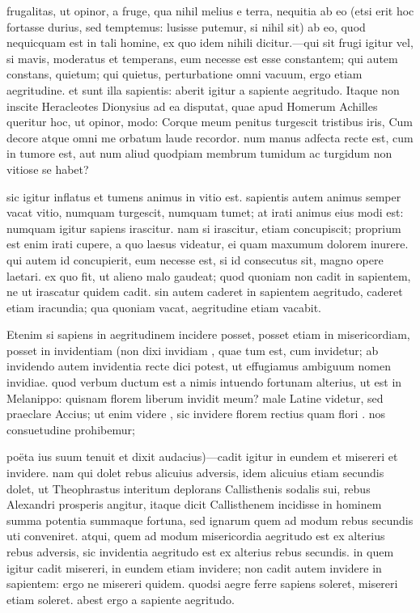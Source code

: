  frugalitas, ut opinor, a fruge, qua nihil melius e terra, nequitia ab eo (etsi erit hoc fortasse durius, sed temptemus: lusisse putemur, si nihil sit) ab eo, quod nequicquam est in tali homine, ex quo idem nihili dicitur.—qui sit frugi igitur vel, si mavis, moderatus et temperans, eum necesse est esse constantem; qui autem constans, quietum; qui quietus, perturbatione omni vacuum, ergo etiam aegritudine. et sunt illa sapientis: aberit igitur a sapiente aegritudo. Itaque non inscite Heracleotes Dionysius ad ea disputat, quae apud Homerum Achilles queritur hoc, ut opinor, modo: Corque meum penitus turgescit tristibus iris, Cum decore atque omni me orbatum laude recordor. num manus adfecta recte est, cum in tumore est, aut num aliud quodpiam membrum tumidum ac turgidum non vitiose se habet?

 sic igitur inflatus et tumens animus in vitio est. sapientis autem animus semper vacat vitio, numquam turgescit, numquam tumet; at irati animus eius modi est: numquam igitur sapiens irascitur. nam si irascitur, etiam concupiscit; proprium est enim irati cupere, a quo laesus videatur, ei quam maxumum dolorem inurere. qui autem id concupierit, eum necesse est, si id consecutus sit, magno opere laetari. ex quo fit, ut alieno malo gaudeat; quod quoniam non cadit in sapientem, ne ut irascatur quidem cadit. sin autem caderet in sapientem aegritudo, caderet etiam iracundia; qua quoniam vacat, aegritudine etiam vacabit.

 Etenim si sapiens in aegritudinem incidere posset, posset etiam in misericordiam, posset in invidentiam (non dixi invidiam , quae tum est, cum invidetur; ab invidendo autem invidentia recte dici potest, ut effugiamus ambiguum nomen invidiae. quod verbum ductum est a nimis intuendo fortunam alterius, ut est in Melanippo: quisnam florem liberum invidit meum? male Latine videtur, sed praeclare Accius; ut enim videre , sic invidere florem rectius quam flori . nos consuetudine prohibemur;

 poëta ius suum tenuit et dixit audacius)—cadit igitur in eundem et misereri et invidere. nam qui dolet rebus alicuius adversis, idem alicuius etiam secundis dolet, ut Theophrastus interitum deplorans Callisthenis sodalis sui, rebus Alexandri prosperis angitur, itaque dicit Callisthenem incidisse in hominem summa potentia summaque fortuna, sed ignarum quem ad modum rebus secundis uti conveniret. atqui, quem ad modum misericordia aegritudo est ex alterius rebus adversis, sic invidentia aegritudo est ex alterius rebus secundis. in quem igitur cadit misereri, in eundem etiam invidere; non cadit autem invidere in sapientem: ergo ne misereri quidem. quodsi aegre ferre sapiens soleret, misereri etiam soleret. abest ergo a sapiente aegritudo.

